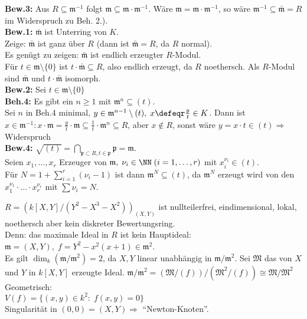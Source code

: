 \begin{Bew}
\textbf{Bew.3:} Aus $R \subseteq \mathfrak{m}^{-1}$ folgt $\mathfrak{m}
\subseteq \mathfrak{m} \cdot \mathfrak{m}^{-1}$. Wäre $\mathfrak{m} =
\mathfrak{m} \cdot \mathfrak{m}^{-1}$, so wäre $\mathfrak{m}^{-1} \subseteq
\bar{\mathfrak{m}} = R$ im Widerspruch zu Beh. 2.).\\
\textbf{Bew.1:} $\bar{\mathfrak{m}}$ ist Unterring von $K$.\\
Zeige: $\bar{\mathfrak{m}}$ ist ganz über $R$ (dann ist $\bar{\mathfrak{m}} =
R$, da $R$ normal).\\
Es genügt zu zeigen: $\bar{\mathfrak{m}}$ ist endlich erzeugter $R$-Modul.\\
Für $t \in \mathfrak{m} \setminus \{0\}$ ist $t \cdot \bar{\mathfrak{m}}
\subseteq R$, also endlich erzeugt, da $R$ noethersch.
Als $R$-Modul sind $\bar{\mathfrak{m}}$ und $t \cdot \bar{\mathfrak{m}}$
isomorph.\\
\textbf{Bew.2:} Sei $t \in \mathfrak{m} \setminus\{0\}$\\
\textbf{Beh.4:} Es gibt ein $n \geq 1$ mit $\mathfrak{m}^n \subseteq (t)$.\\
Sei $n$ in Beh.4 minimal, $y \in \mathfrak{m}^{n-1} \setminus (t), \; x \defeqr
\frac{y}{t} \in K$.
Dann ist $x \in \mathfrak{m}^{-1}: x \cdot \mathfrak{m} = \frac{y}{t} \cdot
\mathfrak{m} \subseteq \frac{1}{t} \cdot \mathfrak{m}^n \subseteq R$, aber $x
\not\in R$, sonst wäre $y = x \cdot t \in (t) \Rightarrow$ Widerspruch\\
\textbf{Bew.4:} $\sqrt{(t)} = \bigcap_{\mathfrak{p} \subset R, t \in
\mathfrak{p}} \mathfrak{p} = \mathfrak{m}$.\\
Seien $x_1, \dots, x_r$ Erzeuger von $\mathfrak{m}, \; \nu_i \in \NN
\;(i=1, \dots,r)$ mit $x_i^{\nu_i} \in (t)$.\\
Für $N = 1 + \sum_{i =1}^r(\nu_i -1)$ ist dann $\mathfrak{m}^N \subseteq (t)$,
da $\mathfrak{m}^N$ erzeugt wird von den $x_1^{\nu_1} \cdot \ldots \cdot
x_r^{\nu_r}$ mit $\sum \nu_i = N$.
\end{Bew}

\begin{nnBsp}
$R = (k[X,Y]/(Y^2-X^3-X^2))_{(X,Y)}$ ist nullteilerfrei, eindimensional, lokal, noethersch aber kein diskreter Bewertungsring.\\
Denn: das maximale Ideal in $R$ ist kein Hauptideal: $\mathfrak{m}=(X,Y), \; f = Y^2-x^2(x+1) \in \mathfrak{m}^2$.\\
Es gilt $\dim_k(\mathfrak{m}/\mathfrak{m}^2) = 2$, da $X,Y$ linear unabhängig in $\mathfrak{m}/\mathfrak{m}^2$.
Sei $\mathfrak{M}$ das von $X$ und $Y$ in $k[X,Y]$ erzeugte Ideal.
$\mathfrak{m}/\mathfrak{m}^2 = (\mathfrak{M}/(f))/(\mathfrak{M}^2/(f)) \cong \mathfrak{M}/\mathfrak{M}^2$\\
Geometrisch:\\
$V(f) = \{(x,y) \in k^2: \; f(x,y) = 0\}$\\
Singularität in $(0,0) = (X,Y) \Rightarrow$ ``Newton-Knoten''.
\end{nnBsp}
